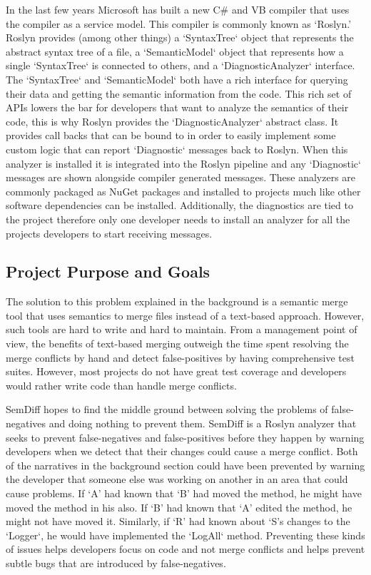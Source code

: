 \documentclass[10pt,draftclsnofoot,onecolumn]{IEEEtran}
\begin{document}
In the last few years Microsoft has built a new C\# and VB compiler that uses the compiler as a service model. This compiler is commonly known as ‘Roslyn.’ Roslyn provides (among other things) a `SyntaxTree` object that represents the abstract syntax tree of a file, a `SemanticModel` object that represents how a single `SyntaxTree` is connected to others, and a `DiagnosticAnalyzer` interface. The `SyntaxTree` and `SemanticModel` both have a rich interface for querying their data and getting the semantic information from the code. This rich set of APIs lowers the bar for developers that want to analyze the semantics of their code, this is why Roslyn provides the `DiagnosticAnalyzer` abstract class. It provides call backs that can be bound to in order to easily implement some custom logic that can report `Diagnostic` messages back to Roslyn. When this analyzer is installed it is integrated into the Roslyn pipeline and any `Diagnostic` messages are shown alongside compiler generated messages. These analyzers are commonly packaged as NuGet packages and installed to projects much like other software dependencies can be installed. Additionally, the diagnostics are tied to the project therefore only one developer needs to install an analyzer for all the projects developers to start receiving messages.

\subsection{Project Purpose and Goals}
The solution to this problem explained in the background is a semantic merge tool that uses semantics to merge files instead of a text-based approach. However, such tools are hard to write and hard to maintain. From a management point of view, the benefits of text-based merging outweigh the time spent resolving the merge conflicts by hand and detect false-positives by having comprehensive test suites. However, most projects do not have great test coverage and developers would rather write code than handle merge conflicts.

SemDiff hopes to find the middle ground between solving the problems of false-negatives and doing nothing to prevent them. SemDiff is a Roslyn analyzer that seeks to prevent false-negatives and false-positives before they happen by warning developers when we detect that their changes could cause a merge conflict. Both of the narratives in the background section could have been prevented by warning the developer that someone else was working on another in an area that could cause problems. If ‘A’ had known that ‘B’ had moved the method, he might have moved the method in his also. If ‘B’ had known that ‘A’ edited the method, he might not have moved it. Similarly, if ‘R’ had known about ‘S’s changes to the `Logger`, he would have implemented the `LogAll` method. Preventing these kinds of issues helps developers focus on code and not merge conflicts and helps prevent subtle bugs that are introduced by false-negatives.
\end{document}
